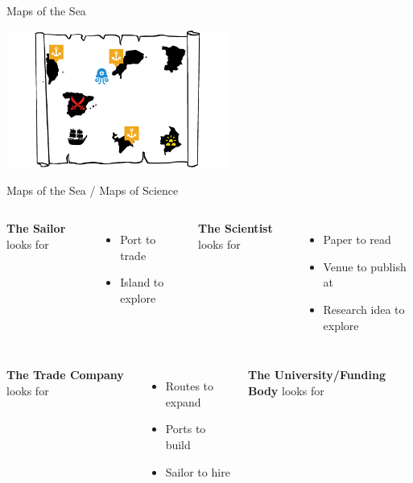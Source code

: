 \documentclass[en,16:9,smallfoot]{sdqbeamer}
\begin{document}
\begin{frame}{Maps of the Sea}
\begin{overprint}
            \centering\includegraphics[width=0.55\textwidth]{imgs/schema_analogy_04}
       \end{overprint}
   \end{frame}

   \begin{frame}[t]{Maps of the Sea / Maps of Science}
   \begin{overprint}
       \begin{columns}[t]
               {\large\textbf{The Sailor} looks for}
               \begin{itemize}
                   \item Port to trade
                   \item Island to explore
               \end{itemize}
               {\large\textbf{The Scientist} looks for}
               \begin{itemize}
                   \item Paper to read
                   \item Venue to publish at
                   \item Research idea to explore
               \end{itemize}
       \end{columns}
       \begin{columns}
               {\large\textbf{The Trade Company} looks for}
               \begin{itemize}
                   \item Routes to expand
                   \item Ports to build
                   \item Sailor to hire
               \end{itemize}
               {\large\textbf{The University/Funding Body} looks for}

\end{columns}
\end{overprint}
\end{frame}
\end{document}
